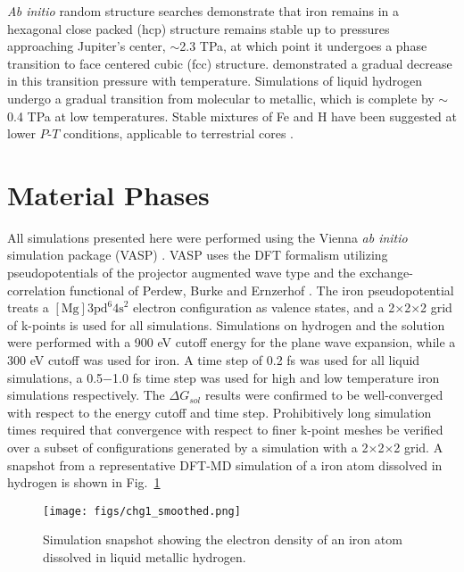{\it Ab initio} random structure searches
\citep{Pickard2009} demonstrate that iron remains in a hexagonal close packed (hcp) structure
remains stable up to pressures approaching Jupiter's center, $\sim$2.3 TPa, at
which point it undergoes a phase transition to face centered cubic (fcc)
structure. \citet{stixrude2012} demonstrated a gradual decrease in this transition
pressure with temperature. Simulations of liquid hydrogen
\citep{Militzer2008,militzer2013a,Mcmahon2012} undergo a gradual transition from molecular to
metallic, which is complete by $\sim$ 0.4 TPa at low temperatures.  Stable
mixtures of Fe and H have been suggested at lower $P$-$T$ conditions,
applicable to terrestrial cores \citep{Bazhanova2012}. 

\section{Material Phases}


All simulations presented here were performed using the Vienna {\it ab initio}
simulation package (VASP) \citep{Kresse1996}. VASP uses the DFT formalism utilizing
pseudopotentials of the projector augmented wave type \citep{Blochl1994} and the exchange-correlation
functional of Perdew, Burke and Ernzerhof \citep{Perdew1996}. The iron
pseudopotential treats a $[\mathrm{Mg}]\mathrm{3pd}^6\mathrm{4s}^2$ electron
configuration as valence states, and a 2$\times$2$\times$2
grid of k-points is used for all simulations. Simulations on hydrogen 
and the solution were performed with a 900 eV cutoff energy for the plane wave expansion, while a 300
eV cutoff was used for iron. A time step of 0.2 fs was used for all liquid simulations, a
0.5$-$1.0 fs time step  was used for high and low temperature iron simulations 
respectively. The $\Delta G_{sol}$ results were confirmed to be well-converged
with respect to the energy cutoff and time step. 
Prohibitively long simulation times required that convergence with respect to
finer k-point meshes be verified over a subset of configurations generated by
a simulation with a 2$\times$2$\times$2 grid. A snapshot from a representative DFT-MD simulation of a iron atom dissolved in hydrogen is shown in Fig.~\ref{fig:HFe_snap}

\begin{figure}[!h] %
   \centering
   \texttt{[image: figs/chg1\_smoothed.png]} 
\caption{ Simulation snapshot showing the electron density of an iron atom dissolved in liquid
    metallic hydrogen.\label{fig:HFe_snap}}
\end{figure}

